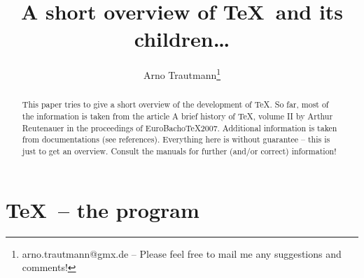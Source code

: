 \documentclass{scrartcl}
\title{A short overview of \TeX\ and its children\dots}
\author{Arno Trautmann\thanks{arno.trautmann@gmx.de -- Please feel free to mail me any suggestions and comments!}}
\date{}
\begin{document}
\maketitle


\begin{abstract}
This paper tries to give a short overview of the development of \TeX. So far, most of the information is taken from the article \textsf{A brief history of \TeX, volume II} by Arthur Reutenauer in the proceedings of \textsf{EuroBacho\TeX 2007}. Additional information is taken from documentations (see references). Everything here is without guarantee -- this is just to get an overview. Consult the manuals for further (and/or correct) information!
\end{abstract}

\newpage
\section*{\TeX\ -- the program}
\Large
\centering
\end{document}
